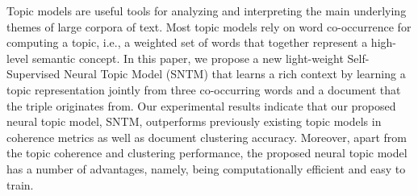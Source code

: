Topic models are useful tools for analyzing and interpreting the main underlying themes of large corpora of text. Most topic models rely on word co-occurrence for computing a topic, i.e., a weighted set of words that together represent a high-level semantic concept. In this paper, we propose a new light-weight Self-Supervised Neural Topic Model (SNTM) that learns a rich context by learning a topic representation jointly from three co-occurring words and a document that the triple originates from. Our experimental results indicate that our proposed neural topic model, SNTM, outperforms previously existing topic models in coherence metrics as well as document clustering accuracy. Moreover, apart from the topic coherence and clustering performance, the proposed neural topic model has a number of advantages, namely, being computationally efficient and easy to train.
